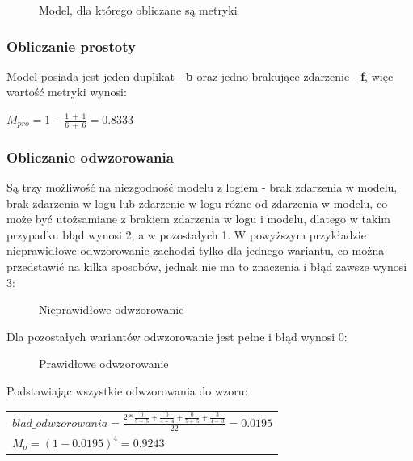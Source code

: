 \begin{figure}[h]
	\caption{\label{fig:metrics_business_process}Model, dla którego obliczane są metryki}
\end{figure}

\subsubsection{Obliczanie prostoty}
Model posiada jest jeden duplikat - \textbf{b} oraz jedno brakujące zdarzenie - \textbf{f}, więc wartość metryki wynosi:
\begin{center}
$M_{pro} = 1 - \frac{1\ +\ 1}{6\ +\ 6} = 0.8333$
\end{center}

\subsubsection{Obliczanie odwzorowania}
\label{alignment-calculation}
Są trzy możliwość na niezgodność modelu z logiem -  brak zdarzenia w modelu, brak zdarzenia w logu lub zdarzenie w logu różne od zdarzenia w modelu, co może być utożsamiane z brakiem zdarzenia w logu i modelu, dlatego w takim przypadku błąd wynosi 2, a w pozostałych 1. W powyższym przykładzie nieprawidłowe odwzorowanie zachodzi tylko dla jednego wariantu, co można przedstawić na kilka sposobów, jednak nie ma to znaczenia i błąd zawsze wynosi 3:
\begin{figure}[H]
	\caption{\label{fig:bad-alignment}Nieprawidłowe odwzorowanie}
\end{figure}
Dla pozostałych wariantów odwzorowanie jest pełne i błąd wynosi 0:
\begin{figure}[h]
	\caption{\label{fig:good-alignment}Prawidłowe odwzorowanie}
\end{figure}
\newline Podstawiając wszystkie odwzorowania do wzoru:
\begin{center}
\begin{tabular}{l}
$blad\_odwzorowania = \frac{2 * \frac{0}{5 +\ 5} + \frac{0}{4 +\ 4} + \frac{0}{5 +\ 5} + \frac{3}{4 +\ 3}}{22} = 0.0195$ \\

$M_o = (1 - 0.0195)^4 = 0.9243$
\end{tabular}
\end{center}

